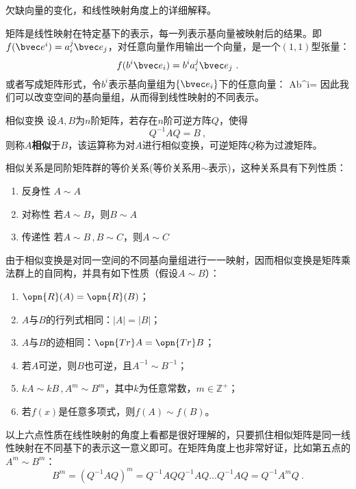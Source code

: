 
\begin{issues}
\issueDraft 欠缺向量的变化，和线性映射角度上的详细解释。
\end{issues}


矩阵是线性映射在特定基下的表示，每一列表示基向量被映射后的结果。即$f(\bvec e^i)=a^j_i\bvec e_j$，对任意向量作用输出一个向量，是一个$(1,1)$型张量：
\begin{equation}
f(b^i\bvec e_i)=b^ia^j_i\bvec e_j~.
\end{equation}
或者写成矩阵形式，令$b^i$表示基向量组为$\{\bvec e_i\}$下的任意向量：
Ab^i=
因此我们可以改变空间的基向量组，从而得到线性映射的不同表示。
\begin{definition}{相似变换}\label{def_MatSim_1}
设$A,B$为$n$阶矩阵，若存在$n$阶可逆方阵$Q$，使得
\begin{equation}
Q^{-1}AQ=B~,
\end{equation}
则称$A$\textbf{相似}于$B$，该运算称为对$A$进行相似变换，可逆矩阵$Q$称为过渡矩阵。
\end{definition}
相似关系是同阶矩阵群的等价关系(等价关系用$\sim $表示)，这种关系具有下列性质：

\begin{enumerate}
\item 反身性 $A\sim A$ 
\item 对称性 若$A\sim B$，则$B\sim A$
\item 传递性 若$A\sim B\,,B\sim C$，则$A\sim C$
\end{enumerate}
由于相似变换是对同一空间的不同基向量组进行一一映射，因而相似变换是矩阵乘法群上的自同构，并具有如下性质（假设$A\sim B$）：
\begin{enumerate}
\item $\opn{R}(A)=\opn{R}(B)$；
\item $A$与$B$的行列式相同：$|A|=|B|$；
\item $A$与$B$的迹相同：$\opn{Tr}A=\opn{Tr}B$；
\item 若$A$可逆，则$B$也可逆，且$A^{-1}\sim B^{-1}$；
\item $kA\sim kB\,,A^m\sim B^m$，其中$k$为任意常数，$m\in \mathbb Z^{+}$；
\item 若$f(x)$是任意多项式，则$f(A)\sim f(B)$。
\end{enumerate}
以上六点性质在线性映射的角度上看都是很好理解的，只要抓住相似矩阵是同一线性映射在不同基下的表示这一意义即可。在矩阵角度上也非常好证，比如第五点的$A^m\sim B^m$：\begin{equation}
B^m=(Q^{-1}AQ)^m=Q^{-1}AQQ^{-1}AQ...Q^{-1}AQ=Q^{-1}A^mQ~.
\end{equation}

